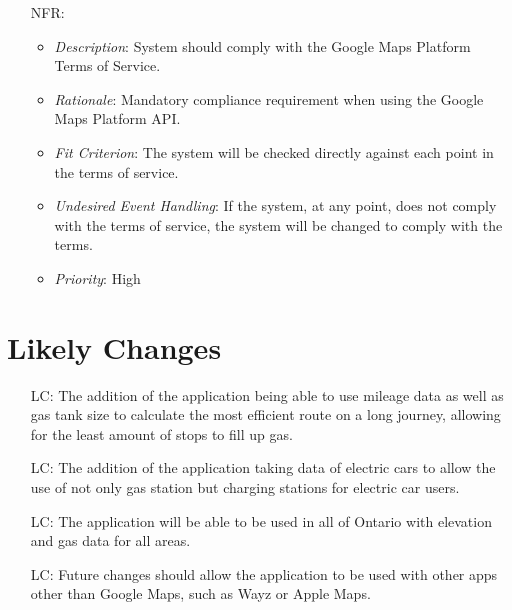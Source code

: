 \documentclass[12pt]{article}
\newcounter{nfrnum} %
\newcounter{lcnum} %
\begin{document}
\begin{itemize}
\item[NFR\refstepcounter{nfrnum}\thenfrnum \label{NFR_21}:] 
\begin{itemize}
  \item \textit{Description}: System should comply with the Google Maps Platform Terms of Service.
  \item \textit{Rationale}: Mandatory compliance requirement when using the Google Maps Platform API. 
  \item \textit{Fit Criterion}: The system will be checked directly against each point in the terms of service.
  \item \textit{Undesired Event Handling}: If the system, at any point, does not comply with the terms of service, the system will be changed to comply with the terms.
  \item \textit{Priority}: High
\end{itemize}

\end{itemize}

\newpage

\section{Likely Changes}    

\noindent \begin{itemize}

\item[LC\refstepcounter{lcnum}\thelcnum\label{Long Journey}:] The addition of the application being able to use mileage data as well as gas tank size to calculate the most efficient route on a long journey, allowing for the least amount of stops to fill up gas.

\item[LC\refstepcounter{lcnum}\thelcnum\label{Electric Cars}:] The addition of the application taking data of electric cars to allow the use of not only gas station but charging stations for electric car users.

\item[LC\refstepcounter{lcnum}\thelcnum\label{Bigger Area}:] The application will be able to be used in all of Ontario with elevation and gas data for all areas.

\item[LC\refstepcounter{lcnum}\thelcnum\label{Application Integration}:] Future changes should allow the application to be used with other apps other than Google Maps, such as Wayz or Apple Maps.

\end{itemize}
\end{document}
